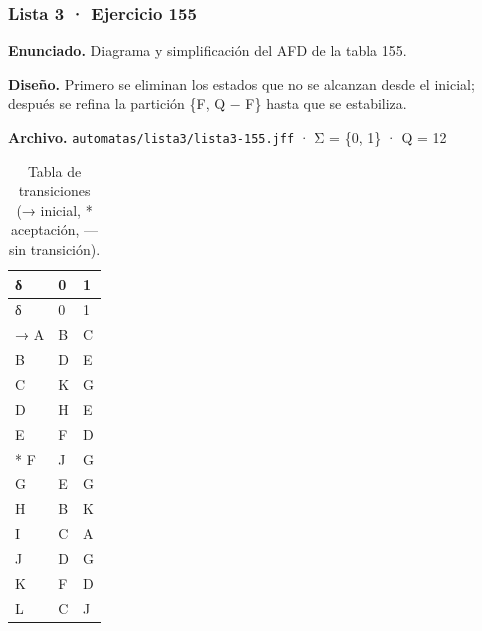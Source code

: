 
\hypertarget{lista-3-ejercicio-155}{%
\subsubsection{Lista 3 · Ejercicio 155}\label{lista-3-ejercicio-155}}

\textbf{Enunciado.} Diagrama y simplificación del AFD de la tabla 155.

\textbf{Diseño.} Primero se eliminan los estados que no se alcanzan desde el inicial; después se refina la partición \{F, Q − F\} hasta que se estabiliza.

\textbf{Archivo.} \texttt{automatas/lista3/lista3-155.jff} · Σ = \{0, 1\} · \textbar Q\textbar{} = 12

\begin{longtable}[]{@{}lll@{}}
\caption{Tabla de transiciones (→ inicial, * aceptación, --- sin transición).}\tabularnewline
\toprule\noalign{}
δ & 0 & 1 \\
\midrule\noalign{}
\endfirsthead
\toprule\noalign{}
δ & 0 & 1 \\
\midrule\noalign{}
\endhead
\bottomrule\noalign{}
\endlastfoot
→ A & B & C \\
B & D & E \\
C & K & G \\
D & H & E \\
E & F & D \\
* F & J & G \\
G & E & G \\
H & B & K \\
I & C & A \\
J & D & G \\
K & F & D \\
L & C & J \\
\end{longtable}

